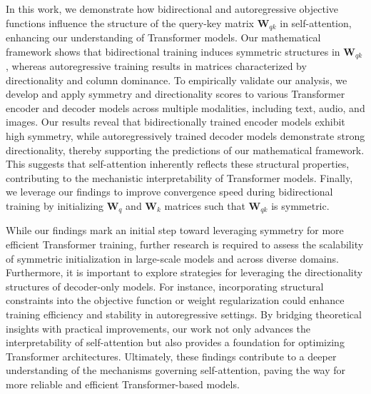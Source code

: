 %
In this work, we demonstrate how bidirectional and autoregressive objective functions influence the structure of the query-key matrix $\bm{W}_{qk}$ in self-attention, enhancing our understanding of Transformer models.
%
Our mathematical framework shows that bidirectional training induces symmetric structures in $\bm{W}_{qk}$, whereas autoregressive training results in matrices characterized by directionality and column dominance.
%
To empirically validate our analysis, we develop and apply symmetry and directionality scores to various Transformer encoder and decoder models across multiple modalities, including text, audio, and images. 
%
Our results reveal that bidirectionally trained encoder models exhibit high symmetry, while autoregressively trained decoder models demonstrate strong directionality, thereby supporting the predictions of our mathematical framework.
%
%
This suggests that self-attention inherently reflects these structural properties, contributing to the mechanistic interpretability of Transformer models.
%
%
Finally, we leverage our findings to improve convergence speed during bidirectional training by initializing $\bm{W}_q$ and  $\bm{W}_k$ matrices such that $\bm{W}_{qk}$ is symmetric.
%

While our findings mark an initial step toward leveraging symmetry for more efficient Transformer training, further research is required to assess the scalability of symmetric initialization in large-scale models and across diverse domains.
%
%
Furthermore, it is important to explore strategies for leveraging the directionality structures of decoder-only models.
%
For instance, incorporating structural constraints into the objective function or weight regularization could enhance training efficiency and stability in autoregressive settings.
%
By bridging theoretical insights with practical improvements, our work not only advances the interpretability of self-attention but also provides a foundation for optimizing Transformer architectures.
%
Ultimately, these findings contribute to a deeper understanding of the mechanisms governing self-attention, paving the way for more reliable and efficient Transformer-based models.